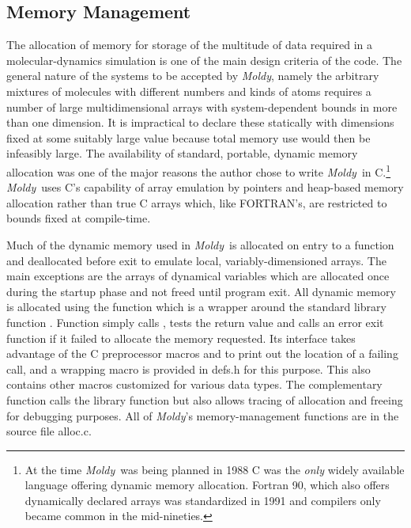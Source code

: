 \documentclass[a4paper,twoside]{report}
\newcommand{\Fname}[1]{{\upshape\mdseries\sffamily#1}}
\newcommand{\moldy}{\emph{Moldy}}
\begin{document}
\subsection{Memory Management}

The allocation of memory for storage of the multitude of data required
in a molecular-dynamics simulation is one of the main design criteria
of the code. The general nature of the systems to be accepted by
\moldy, namely the arbitrary mixtures of molecules with different
numbers and kinds of atoms requires a number of large multidimensional
arrays with system-dependent bounds in more than one dimension.  It is
impractical to declare these statically with dimensions fixed at some
suitably large value because total memory use would then be infeasibly
large.  The availability of standard, portable, dynamic memory
allocation was one of the major reasons the author chose to write
\moldy\ in C.\footnote{At the time \moldy\ was being planned in 1988 C
  was the \emph{only} widely available language offering dynamic
  memory allocation.  Fortran 90, which also offers dynamically
  declared arrays was standardized in 1991 and compilers only became
  common in the mid-nineties.} \moldy\ uses C's capability of array
emulation by pointers and heap-based memory
allocation\cite{kernighan:88} rather than true C arrays which, like
FORTRAN's, are restricted to bounds fixed at compile-time.

Much of the dynamic memory used in \moldy\ is allocated on entry to a
function and deallocated before exit to emulate local,
variably-dimensioned arrays.  The main exceptions are the arrays of
dynamical variables which are allocated once during the startup phase
and not freed until program exit.  All dynamic memory is allocated
using the function  which is a wrapper around the
standard library function .  Function 
simply calls , tests the return value and calls an error
exit function if it failed to allocate the memory requested.  Its
interface takes advantage of the C preprocessor macros
 and  to print out the location of
a failing call, and a wrapping macro  is provided in
\Fname{defs.h} for this purpose. This also contains other
 macros customized for various data types.  The
complementary function  calls the library function
 but also allows tracing of allocation and freeing for
debugging purposes.  All of \moldy's memory-management functions are
in the source file \Fname{alloc.c}.
\end{document}
